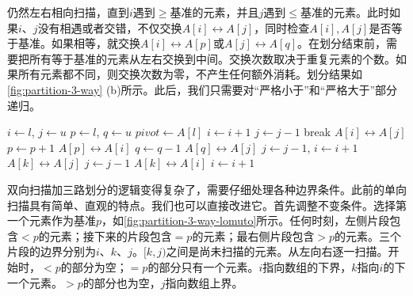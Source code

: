\documentclass[b5paper]{ctexart}
\begin{document}
仍然左右相向扫描，直到$i$遇到$\geq$基准的元素，并且$j$遇到$\leq$基准的元素。此时如果$i$、$j$没有相遇或者交错，不仅交换$A[i] \leftrightarrow A[j]$，同时检查$A[i], A[j]$是否等于基准。如果相等，就交换$A[i] \leftrightarrow A[p]$或$A[j] \leftrightarrow A[q]$。在划分结束前，需要把所有等于基准的元素从左右交换到中间。交换次数取决于重复元素的个数。如果所有元素都不同，则交换次数为零，不产生任何额外消耗。划分结果如\cref{fig:partition-3-way} (b)所示。此后，我们只需要对“严格小于”和“严格大于”部分递归。

\begin{algorithmic}[1]
    \State $i \gets l$, $j \gets u$
    \State $p \gets l$, $q \gets u$ 
    \State $pivot \gets A[l]$
    \Loop
      \Repeat
        \State $i \gets i + 1$
       
      \Repeat
        \State $j \gets j - 1$
       
        \State break
      \EndIf
      \State {} $A[i] \leftrightarrow A[j]$
       
        \State $p \gets p + 1$
        \State {} $A[p] \leftrightarrow A[i]$
      \EndIf
        \State $q \gets q - 1$
        \State {} $A[q] \leftrightarrow A[j]$
      \EndIf
    \EndLoop
      \State $j \gets j - 1$, $i \gets i + 1$
    \EndIf
     
      \State {} $A[k] \leftrightarrow A[j]$
      \State $j \gets j - 1$
    \EndFor
      \State {} $A[k] \leftrightarrow A[i]$
      \State $i \gets i + 1$
    \EndFor
    \State {}
    \State {}
  \EndIf
\EndProcedure
\end{algorithmic}

双向扫描加三路划分的逻辑变得复杂了，需要仔细处理各种边界条件。此前的单向扫描具有简单、直观的特点。我们也可以直接改进它。首先调整不变条件。选择第一个元素作为基准$p$，如\cref{fig:partition-3-way-lomuto}所示。任何时刻，左侧片段包含$< p$的元素；接下来的片段包含$= p$的元素；最右侧片段包含$> p$的元素。三个片段的边界分别为$i$、$k$、$j$。$[k, j)$之间是尚未扫描的元素。从左向右逐一扫描。开始时，$< p$的部分为空；$= p$的部分只有一个元素。$i$指向数组的下界，$k$指向$i$的下一个元素。$> p$的部分也为空，$j$指向数组上界。
\end{document}

